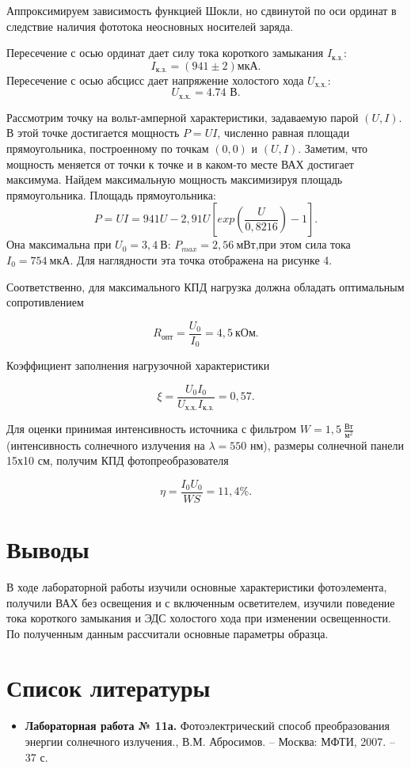 \documentclass[a4paper, 12pt]{article}
\begin{document}
Аппроксимируем зависимость функцией Шокли, но сдвинутой по оси ординат в следствие наличия фототока неосновных носителей заряда. 

 Пересечение с осью ординат дает силу тока короткого замыкания $I_{\text{к.з.}}$: 
    \[ \boxed{I_{\text{к.з.}} = (941 \pm 2) \text{мкА}}. \]
Пересечение с осью абсцисс дает напряжение холостого хода $U_{\text{х.х.}}$:
\[\boxed{U_{\text{х.х.}} = 4.74 \text{ В}}.\]

Рассмотрим точку на вольт-амперной характеристики, задаваемую парой $(U, I)$. В этой точке достигается мощность $P = UI$, численно равная площади прямоугольника, построенному по точкам $(0,0)$ и $(U, I)$. Заметим, что мощность меняется от точки к точке и в каком-то месте ВАХ достигает максимума. Найдем максимальную мощность максимизируя площадь прямоугольника. Площадь прямоугольника:
$$
        P = UI = 941U -2,91U \left[ exp\left( \frac{U}{0,8216} \right) - 1 \right]
        \label{formula_light_VAC_equation}.
$$
Она максимальна при $\boxed{U_0 = 3,4\ \text{В}}$: $\boxed{P_{max} = 2,56\ \text{мВт}}$,при этом сила тока $\boxed{I_0 = 754\ \text{мкА}}$. Для наглядности эта точка отображена на рисунке 4.

Соответственно, для максимального КПД нагрузка должна обладать оптимальным сопротивлением 

$$
        \boxed{R_{опт} = \frac{U_0}{I_0} = 4,5\ \text{кОм}}
        \label{formula_R_opt}.
$$

Коэффициент заполнения нагрузочной характеристики 

$$
        \boxed{\xi = \frac{U_0 I_0}{U_{\text{х.х.}} I_{\text{к.з.}}} = 0,57}
        \label{formula_R_opt}.
$$

Для оценки принимая интенсивность источника с фильтром $W = 1,5\  \frac{\text{Вт}}{\text{м}^2}$(интенсивность солнечного излучения на $\lambda=550$ нм), размеры солнечной панели 15х10 см, получим КПД фотопреобразователя

  $$
        \boxed{\eta = \frac{I_0 U_0}{W S} = 11,4\%}
        \label{formula_efficiency_factor}.
 $$

\section{Выводы}
В ходе лабораторной работы изучили основные характеристики фотоэлемента, получили ВАХ без освещения и с включенным осветителем, изучили поведение тока короткого замыкания и ЭДС холостого хода при изменении освещенности. По полученным данным рассчитали основные параметры образца. 
\section{Список литературы}
\begin{itemize}
    \item\textbf{Лабораторная работа № 11а.} Фотоэлектрический способ преобразования энергии солнечного излучения., В.М. Абросимов. -- Москва: МФТИ, 2007. -- 37 с.  
\end{itemize}
\end{document}
